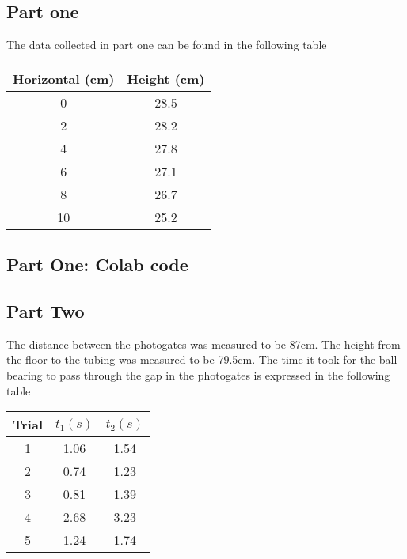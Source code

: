 \documentclass{report}
\begin{document}
    \subsection{Part one}
    \bigbreak \noindent 
    The data collected in part one can be found in the following table
    \bigbreak \noindent 
    \begin{center}
        \begin{tabular}{c|c}
            Horizontal (cm) & Height (cm) \\
        \hline
            0 & 28.5\\
            2 & 28.2\\
            4 & 27.8\\
            6 & 27.1\\
            8 & 26.7\\
            10 & 25.2
        \end{tabular}
    \end{center}

    \bigbreak \noindent 
    \subsection{Part One: Colab code}
    \bigbreak \noindent 

    \bigbreak \noindent 
    \subsection{Part Two}
    \bigbreak \noindent 
    The distance between the photogates was measured to be 87cm. The height from the floor to the tubing was measured to be 79.5cm. The time it took for the ball bearing to pass through the gap in the photogates is expressed in the following table
    \bigbreak \noindent 
    \begin{center}
        \begin{tabular}{c|c|c}
            Trial & $t_{1} (s)$ & $t_{2} (s)$ \\
            \hline
            1 & 1.06 & 1.54  \\
            2 & 0.74& 1.23  \\
            3 & 0.81 & 1.39 \\
            4 & 2.68 & 3.23 \\
            5 & 1.24 & 1.74
        \end{tabular}
    \end{center}
    \bigbreak \noindent 
\end{document}

